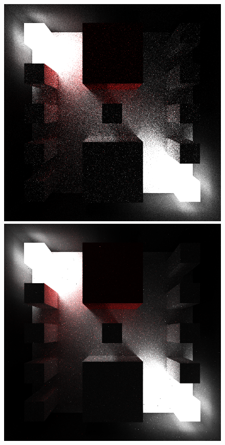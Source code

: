 \documentclass[ %
                    author={Callum Pearce},
                supervisor={Dr. Neill Campbell},
                    degree={MEng},
                     title={Learning the incident radiance for a continuous state space rather than a discrete one is more beneficial for Importance Sampling in Monte Carlo Path Tracing},
                  subtitle={},
                      type={research},
                      year={2019} ]{dissertation}
\begin{document}
\begin{figure}[h]
\centering
{}
  \includegraphics[width=\textwidth]{images/renders/complex_pillars/default.png}   
\endminipage\hspace{1em}
  \includegraphics[width=\textwidth]{images/renders/complex_pillars/sarsa.png}   

\end{figure}
\end{document}

